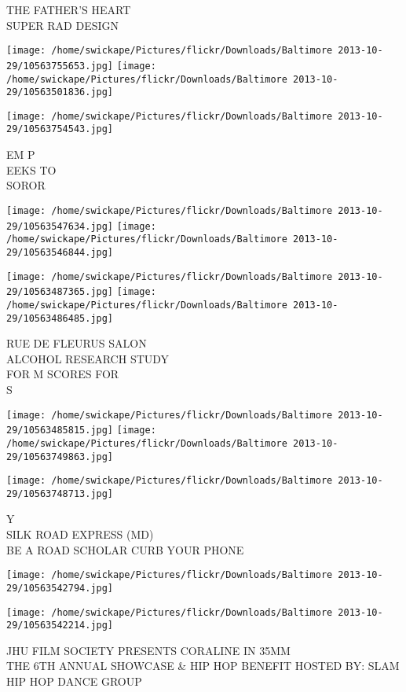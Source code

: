 \documentclass[10pt,letterpaper]{article}
\begin{document}
THE FATHER'S HEART\\
SUPER RAD DESIGN
\pagebreak

\texttt{[image: /home/swickape/Pictures/flickr/Downloads/Baltimore 2013-10-29/10563755653.jpg]}
\texttt{[image: /home/swickape/Pictures/flickr/Downloads/Baltimore 2013-10-29/10563501836.jpg]}

\vspace{0.25in}
\texttt{[image: /home/swickape/Pictures/flickr/Downloads/Baltimore 2013-10-29/10563754543.jpg]}

EM P\\
EEKS TO\\
SOROR
\pagebreak

\texttt{[image: /home/swickape/Pictures/flickr/Downloads/Baltimore 2013-10-29/10563547634.jpg]}
\texttt{[image: /home/swickape/Pictures/flickr/Downloads/Baltimore 2013-10-29/10563546844.jpg]}

\texttt{[image: /home/swickape/Pictures/flickr/Downloads/Baltimore 2013-10-29/10563487365.jpg]}
\texttt{[image: /home/swickape/Pictures/flickr/Downloads/Baltimore 2013-10-29/10563486485.jpg]}

RUE DE FLEURUS SALON\\
ALCOHOL RESEARCH STUDY\\
FOR M SCORES FOR\\
S
\pagebreak

\texttt{[image: /home/swickape/Pictures/flickr/Downloads/Baltimore 2013-10-29/10563485815.jpg]}
\texttt{[image: /home/swickape/Pictures/flickr/Downloads/Baltimore 2013-10-29/10563749863.jpg]}

\vspace{0.25in}
\texttt{[image: /home/swickape/Pictures/flickr/Downloads/Baltimore 2013-10-29/10563748713.jpg]}

Y\\
SILK ROAD EXPRESS (MD)\\
BE A ROAD SCHOLAR CURB YOUR PHONE
\pagebreak

\texttt{[image: /home/swickape/Pictures/flickr/Downloads/Baltimore 2013-10-29/10563542794.jpg]}

\vspace{0.25in}
\texttt{[image: /home/swickape/Pictures/flickr/Downloads/Baltimore 2013-10-29/10563542214.jpg]}

JHU FILM SOCIETY PRESENTS CORALINE IN 35MM\\
THE 6TH ANNUAL SHOWCASE \& HIP HOP BENEFIT HOSTED BY: SLAM HIP HOP DANCE GROUP
\pagebreak
\end{document}
